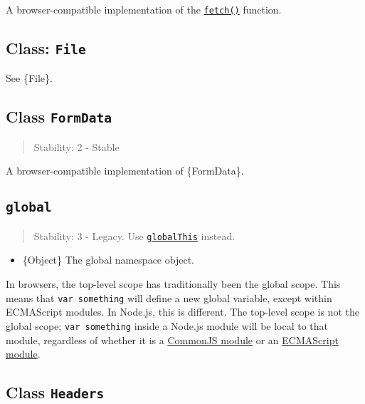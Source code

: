 A browser-compatible implementation of the
\href{https://developer.mozilla.org/en-US/docs/Web/API/fetch}{\texttt{fetch()}}
function.

\subsection{\texorpdfstring{Class:
\texttt{File}}{Class: File}}\label{class-file}

See \{File\}.

\subsection{\texorpdfstring{Class
\texttt{FormData}}{Class FormData}}\label{class-formdata}

\begin{quote}
Stability: 2 - Stable
\end{quote}

A browser-compatible implementation of \{FormData\}.

\subsection{\texorpdfstring{\texttt{global}}{global}}\label{global}

\begin{quote}
Stability: 3 - Legacy. Use
\href{https://developer.mozilla.org/en-US/docs/Web/JavaScript/Reference/Global_Objects/globalThis}{\texttt{globalThis}}
instead.
\end{quote}

\begin{itemize}
\tightlist
\item
  \{Object\} The global namespace object.
\end{itemize}

In browsers, the top-level scope has traditionally been the global
scope. This means that \texttt{var\ something} will define a new global
variable, except within ECMAScript modules. In Node.js, this is
different. The top-level scope is not the global scope;
\texttt{var\ something} inside a Node.js module will be local to that
module, regardless of whether it is a \href{modules.md}{CommonJS module}
or an \href{esm.md}{ECMAScript module}.

\subsection{\texorpdfstring{Class
\texttt{Headers}}{Class Headers}}\label{class-headers}

